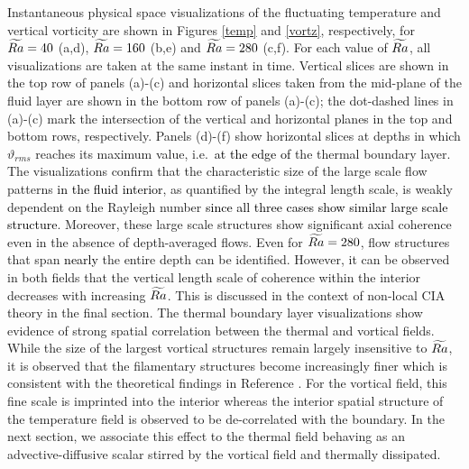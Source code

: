 Instantaneous physical space visualizations of the fluctuating temperature and vertical vorticity are shown in Figures \ref{temp} and \ref{vortz}, respectively, for $\widetilde{Ra}=40$ (a,d), $\widetilde{Ra}=160$ (b,e) and $\widetilde{Ra}=280$ (c,f). 
For each value of $\widetilde{Ra}$, all visualizations are taken at the same instant in time.
Vertical slices are shown in the top row of panels (a)-(c) and horizontal slices taken from the mid-plane of the fluid layer are shown in the bottom row of panels (a)-(c); the dot-dashed lines in (a)-(c) mark the intersection of the vertical and horizontal planes in the top and bottom rows, respectively.
Panels (d)-(f) show horizontal slices at depths in which $\vartheta_{rms}$ reaches its maximum value, i.e.~\textcolor{black}{at the edge of} the thermal boundary layer.
The visualizations confirm that the characteristic size of the large scale flow patterns \textcolor{black}{in the fluid interior}, as quantified by the integral length scale, is weakly dependent on the Rayleigh number \textcolor{black}{since all three cases show similar large scale structure}. 
Moreover, these large scale structures show significant axial coherence even in the absence of depth-averaged flows.
Even for $\widetilde{Ra} =280$, flow structures that span \textcolor{black}{nearly} the entire depth can be identified. However, it can be observed in both fields that the vertical length scale of coherence within the interior decreases with increasing $\widetilde{Ra}$. This is discussed in the context of non-local CIA theory in the final section.
The thermal boundary layer visualizations show evidence of strong spatial correlation between the thermal and vortical fields. While the size of the largest vortical structures remain largely insensitive to $\widetilde{Ra}$, it is observed that the filamentary structures become increasingly finer which is consistent with the theoretical findings in Reference \citep{kJ12b}. For the vortical field, this fine scale is imprinted into the interior whereas the interior spatial structure of the temperature field is observed to be de-correlated with the boundary. In the next section, we associate this effect to the thermal field behaving as an advective-diffusive scalar stirred by the vortical field and thermally dissipated. 

